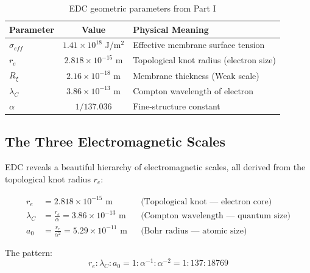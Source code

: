 \begin{table}[h]
\centering
\begin{tabular}{|l|c|l|}
\hline
\textbf{Parameter} & \textbf{Value} & \textbf{Physical Meaning} \\
\hline
$\sigma_{eff}$ & $1.41 \times 10^{18}$ J/m$^2$ & Effective membrane surface tension \\
$r_e$ & $2.818 \times 10^{-15}$ m & Topological knot radius (electron size) \\
$R_\xi$ & $2.16 \times 10^{-18}$ m & Membrane thickness (Weak scale) \\
$\lambda_C$ & $3.86 \times 10^{-13}$ m & Compton wavelength of electron \\
$\alpha$ & $1/137.036$ & Fine-structure constant \\
\hline
\end{tabular}
\caption{EDC geometric parameters from Part I}
\label{tab:edc_parameters}
\end{table}

\subsection{The Three Electromagnetic Scales}
\label{subsec:three_scales}

EDC reveals a beautiful hierarchy of electromagnetic scales, all derived from the topological knot radius $r_e$:

\begin{tcolorbox}[colback=blue!5,colframe=blue!70,title=\textbf{The Electromagnetic Scale Hierarchy}]
\begin{align}
r_e &= 2.818 \times 10^{-15} \text{ m} && \text{(Topological knot --- electron core)} \\
\lambda_C &= \frac{r_e}{\alpha} = 3.86 \times 10^{-13} \text{ m} && \text{(Compton wavelength --- quantum size)} \\
a_0 &= \frac{r_e}{\alpha^2} = 5.29 \times 10^{-11} \text{ m} && \text{(Bohr radius --- atomic size)}
\end{align}

The pattern:
\begin{equation}
\boxed{r_e : \lambda_C : a_0 = 1 : \alpha^{-1} : \alpha^{-2} = 1 : 137 : 18769}
\end{equation}
\end{tcolorbox}

